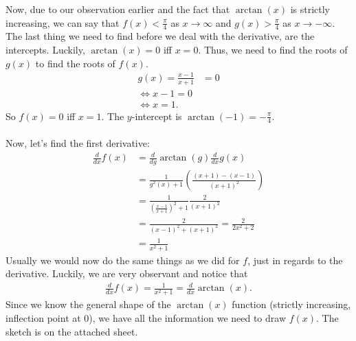 \documentclass{article}
\begin{document}
Now, due to our observation earlier and the fact that $\arctan(x)$ is strictly increasing, we can say that $f(x)<\frac{\pi}{4}$ as $x\to\infty$ and $g(x)>\frac{\pi}{4}$ as $x\to -\infty$.\\
The last thing we need to find before we deal with the derivative, are the intercepts. Luckily, $\arctan(x)=0$ iff $x=0$. Thus, we need to find the roots of $g(x)$ to find the roots of $f(x)$.
\begin{align*}
  g(x)=\frac{x-1}{x+1}&=0\\
  \Leftrightarrow x-1 = 0\\
  \Leftrightarrow x = 1.
\end{align*}
So $f(x)=0$ iff $x=1$. The $y$-intercept is $\arctan(-1)=-\frac{\pi}{4}$.\\\\
Now, let's find the first derivative:
\begin{align*}
  \frac{d}{dx}f(x) &=\frac{d}{dg}\arctan(g)\frac{d}{dx}g(x)\\
  &=\frac{1}{g^2(x)+1}\left(\frac{(x+1)-(x-1)}{(x+1)^2}\right)\\
  &=\frac{1}{\left(\frac{x-1}{x+1}\right)^2+1}\frac{2}{(x+1)^2}\\
  &=\frac{2}{(x-1)^2+(x+1)^2} = \frac{2}{2x^2+2}\\
  &=\frac{1}{x^2+1}
\end{align*}
Usually we would now do the same things as we did for $f$, just in regards to the derivative. Luckily, we are very observant and notice that
\begin{align*}
  \frac{d}{dx}f(x)=\frac{1}{x^2+1}=\frac{d}{dx}\arctan(x).
\end{align*}
Since we know the general shape of the $\arctan(x)$ function (strictly increasing, inflection point at $0$), we have all the information we need to draw $f(x)$. The sketch is on the attached sheet.
\end{document}
